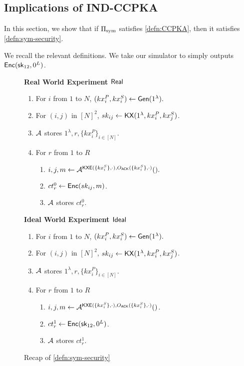 \subsection{Implications of IND-CCPKA}
In this section, we show that if $\Pi_{\text{sym}}$ satisfies \cref{defn:CCPKA}, then it satisfies \cref{defn:sym-security}.

We recall the relevant definitions. We take our simulator to simply outputs $\mathsf{Enc}({\mathsf{sk}}_{12}, 0^{L})$.
\begin{figure}[h!]
\begin{framed}
\textbf{Real World Experiment $\mathsf{Real}$}
\begin{enumerate}
    \item For $i$ from $1$ to $N$, $(kx_i^P, kx_i^S) \leftarrow \mathsf{Gen}(1^{\lambda}).$
    \item For $(i, j)$ in $[N]^2$, $sk_{ij} \leftarrow \mathsf{KX}(1^{\lambda}, kx_i^P, kx_j^S)$.
    \item $\mathcal{A}$ stores $1^{\lambda}, r, \{kx_i^P\}_{i \in [N]}$.
    \item For $r$ from $1$ to $R$
    \begin{enumerate}
        \item $i, j, m \leftarrow \mathcal{A}^{\mathsf{KXE}(\{kx_i^S\}, \cdot), O_{\mathsf{ACK}}(\{kx_i^S\}, \cdot)}().$
        \item $ct^{0}_r \leftarrow \mathsf{Enc}(sk_{ij}, m)$.
        \item $\mathcal{A}$ stores $ct^{0}_r$.
    \end{enumerate}
\end{enumerate}
\textbf{Ideal World Experiment $\mathsf{Ideal}$}
\begin{enumerate}
    \item For $i$ from $1$ to $N$, $(kx_i^P, kx_i^S) \leftarrow \mathsf{Gen}(1^{\lambda}).$
    \item For $(i, j)$ in $[N]^2$, $sk_{ij} \leftarrow \mathsf{KX}(1^{\lambda}, kx_i^P, kx_j^S)$.
    \item $\mathcal{A}$ stores $1^{\lambda}, r, \{kx_i^P\}_{i \in [N]}$.
    \item For $r$ from $1$ to $R$
    \begin{enumerate}
        \item $i, j, m \leftarrow \mathcal{A}^{\mathsf{KXE}(\{kx_i^S\}, \cdot), O_{\mathsf{ACK}}(\{kx_i^S\}, \cdot)}()$.
        \item $ct^1_r \leftarrow \mathsf{Enc}({\mathsf{sk}}_{12}, 0^{L})$.
        \item $\mathcal{A}$ stores $ct^{1}_r$.
    \end{enumerate}
\end{enumerate}
\end{framed}
\caption{Recap of \cref{defn:sym-security}}
\end{figure}
